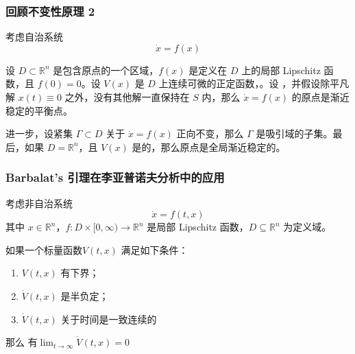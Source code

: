 \begin{frame}
  \frametitle{回顾不变性原理 2}
  考虑自治系统
\[
\dot{x} = f(x) \tag{1}
\]

\begin{theorem}
\parencite[定理 3.5]{khalilNonlinearControl2015}
设 $D\subset\mathbb{R}^n$ 是包含原点的一个区域，$f(x)$ 是定义在 $D$ 上的局部 Lipschitz 函数，且 $f(0)=0$。设 $V(x)$ 是 $D$ 上连续可微的正定函数，。设 ，并假设除平凡解 $x(t)\equiv 0$ 之外，没有其他解一直保持在 $S$ 内，那么 $\dot{x}=f(x)$ 的原点是渐近稳定的平衡点。

进一步，设紧集 $\Gamma\subset D$ 关于 $\dot{x}=f(x)$ 正向不变，那么 $\Gamma$ 是吸引域的子集。最后，如果 $D=\mathbb{R}^n$，且 $V(x)$ 是的，那么原点是全局渐近稳定的。
\end{theorem}

\end{frame}



\begin{frame}
  \frametitle{Barbalat's 引理在李亚普诺夫分析中的应用}

  考虑非自治系统
\[
\dot{x} = f(t,x) 
\]
其中 $x \in \mathbb{R}^n$，$f: D\times[0,\infty) \to \mathbb{R}^n$ 是局部 Lipschitz 函数，$D \subseteq \mathbb{R}^n$ 为定义域。
  
  \begin{theorem} 
    \parencite[Theorem 2.5]{Chen2015}
    如果一个标量函数$V(t,x)$ 满足如下条件：
    \begin{enumerate}
      \item $V(t,x)$ 有下界；
      \item $\dot{V}(t,x)$ 是半负定；
      \item $\dot{V}(t,x)$ 关于时间是一致连续的
    \end{enumerate}
    那么 有$\lim_{t\to\infty} \dot{V}(t,x)=0$
  \end{theorem} 
\end{frame}
